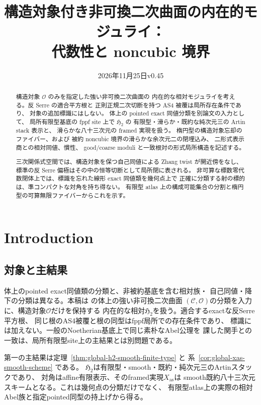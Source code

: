 \documentclass[a4paper,11pt]{ltjsarticle}
\title{構造対象付き非可換二次曲面の内在的モジュライ：\\代数性と noncubic 境界}
\author{}
\date{2026年11月25日\quad v0.45}
\numberwithin{equation}{section}
\theoremstyle{plain}
\theoremstyle{definition}
\theoremstyle{remark}
\newcommand{\OO}{\mathcal O}
\newcommand{\HHstack}{\mathfrak H_2}
\begin{document}
\maketitle
\begin{abstract}
構造対象 $\mathcal O$ のみを指定した強い非可換二次曲面の
内在的な相対モジュライを考える。反 Serre の適合平方根と
正則正規二次切断を持つ AS4 被覆は局所存在条件であり、
対象の追加標識にはしない。
体上の pointed exact 同値分類を別論文の入力として、
局所有限型基底の fppf site 上で $\mathfrak H_2$ の
有限型・滑らか・既約な純次元三の Artin stack 表示と、
滑らかな八十三次元の framed 実現を扱う。
楕円型の構造対象忘却のファイバー、および
被約 noncubic 境界の滑らかな余次元二の閉埋込み、
二形式表示商との相対同値、慣性、
good/coarse moduli と一致根対の形式局所構造を記述する。

三次関係式空間では、構造対象を保つ自己同値による Zhang twist が開近傍をなし、
標準の反 Serre 偏極はその中の恒等切断として局所閉に表される。
非可算な標数零代数閉体上では、標識を忘れた線形 exact 同値類を幾何点上で
正確に分類する射の標的は、準コンパクトな対角を持ち得ない。
有限型 atlas 上の構成可能集合の分割と楕円型の可算無限ファイバーからこれを示す。
\end{abstract}
\tableofcontents

\section{Introduction}\label{sec:moduli-intro}

\subsection{対象と主結果}
体上のpointed exact同値類の分類と、非被約基底を含む相対族・
自己同値・降下の分類は異なる。本稿は
\cite{QuadricIntrinsic2026} の体上の強い非可換二次曲面
$(\mathcal C,\OO)$の分類を入力に、構造対象$\OO$だけを保持する
内在的な相対$\HHstack$を扱う。適合するexactな反Serre平方根、
同じ根のAS4被覆と根の同型はfppf局所での存在条件であり、
標識には加えない。一般のNoetherian基底上で同じ素朴なAbel公理を
課した関手との一致は、局所有限型site上の主結果とは別問題である。

第一の主結果は定理~\ref{thm:global-h2-smooth-finite-type} と
系~\ref{cor:global-xas-smooth-scheme} である。
$\HHstack$は有限型・smooth・既約・純次元三のArtinスタックであり、
対角はaffine有限表示、そのframed実現$X_{\mathrm{as}}$は
smooth既約八十三次元スキームとなる。これは幾何点の分類だけでなく、
有限型atlas上の実際の相対Abel族と指定pointed同型の持上げから得る。
\end{document}
